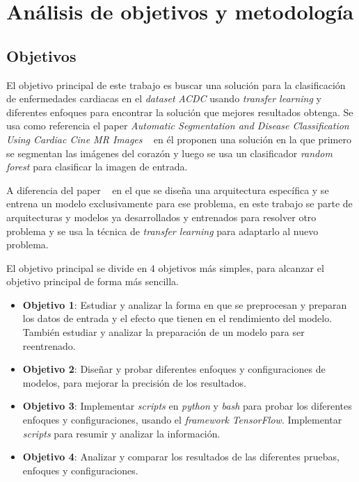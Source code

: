 \documentclass[12pt,a4paper]{article}
\begin{document}
\newpage
\section{Análisis de objetivos y metodología}
\subsection{Objetivos}
El objetivo principal de este trabajo es buscar una solución para la clasificación de enfermedades cardiacas en el \textit{dataset} \textit{ACDC} usando \textit{transfer learning} y diferentes enfoques para encontrar la solución que mejores resultados obtenga. Se usa como referencia el paper \textit{Automatic Segmentation and Disease Classification Using Cardiac Cine MR Images} ~\cite{DBLP:journals/corr/abs-1708-01141} en él proponen una solución en la que primero se segmentan las imágenes del corazón y luego se usa un clasificador \textit{random forest} para clasificar la imagen de entrada.
\bigskip

A diferencia del paper ~\cite{DBLP:journals/corr/abs-1708-01141} en el que se diseña una arquitectura específica y se entrena un modelo exclusivamente para ese problema, en este trabajo se parte de arquitecturas y modelos ya desarrollados y entrenados para resolver otro problema y se usa la técnica de \textit{transfer learning} para adaptarlo al nuevo problema.
\bigskip

El objetivo principal se divide en 4 objetivos más simples, para alcanzar el objetivo principal de forma más sencilla.

\begin{itemize}
\item \textbf{Objetivo 1}: Estudiar y analizar la forma en que se preprocesan y preparan los datos de entrada y el efecto que tienen en el rendimiento del modelo. También estudiar y analizar la preparación de un modelo para ser reentrenado.

\item \textbf{Objetivo 2}: Diseñar y probar diferentes enfoques y configuraciones de modelos, para mejorar la precisión de los resultados.

\item \textbf{Objetivo 3}: Implementar \textit{scripts} en \textit{python} y \textit{bash} para probar los diferentes enfoques y configuraciones, usando el \textit{framework} \textit{TensorFlow}. Implementar \textit{scripts} para resumir y analizar la información.

\item \textbf{Objetivo 4}: Analizar y comparar los resultados de las diferentes pruebas, enfoques y configuraciones.
\end{itemize}
\end{document}
